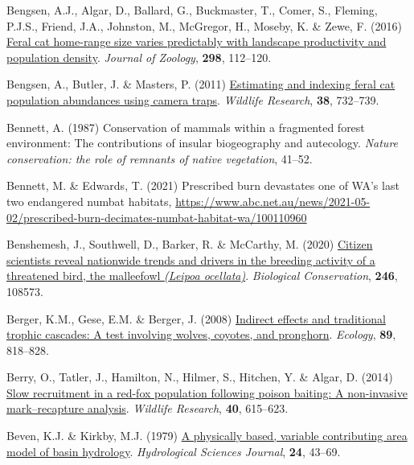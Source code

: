 \documentclass[11pt,a4paper,titlepage,twoside,openright]{style/unimelbthesis}
\newenvironment{CSLReferences}%
  {}%
  {\par}
\begin{document}
\begin{mainmatter}
\begin{CSLReferences}{1}{0}
\leavevmode{}%
Bengsen, A.J., Algar, D., Ballard, G., Buckmaster, T., Comer, S., Fleming, P.J.S., Friend, J.A., Johnston, M., McGregor, H., Moseby, K. \& Zewe, F. (2016) \href{https://doi.org/10.1111/jzo.12290}{Feral cat home-range size varies predictably with landscape productivity and population density}. \emph{Journal of Zoology}, \textbf{298}, 112--120.

\leavevmode{}%
Bengsen, A., Butler, J. \& Masters, P. (2011) \href{https://doi.org/10.1071/WR11134}{Estimating and indexing feral cat population abundances using camera traps}. \emph{Wildlife Research}, \textbf{38}, 732--739.

\leavevmode{}%
Bennett, A. (1987) Conservation of mammals within a fragmented forest environment: The contributions of insular biogeography and autecology. \emph{Nature conservation: the role of remnants of native vegetation}, 41--52.

\leavevmode{}%
Bennett, M. \& Edwards, T. (2021) Prescribed burn devastates one of {WA's} last two endangered numbat habitats, \url{https://www.abc.net.au/news/2021-05-02/prescribed-burn-decimates-numbat-habitat-wa/100110960}

\leavevmode{}%
Benshemesh, J., Southwell, D., Barker, R. \& McCarthy, M. (2020) \href{https://doi.org/10.1016/j.biocon.2020.108573}{Citizen scientists reveal nationwide trends and drivers in the breeding activity of a threatened bird, the malleefowl \emph{({Leipoa ocellata})}}. \emph{Biological Conservation}, \textbf{246}, 108573.

\leavevmode{}%
Berger, K.M., Gese, E.M. \& Berger, J. (2008) \href{https://doi.org/10.1890/07-0193.1}{Indirect effects and traditional trophic cascades: A test involving wolves, coyotes, and pronghorn}. \emph{Ecology}, \textbf{89}, 818--828.

\leavevmode{}%
Berry, O., Tatler, J., Hamilton, N., Hilmer, S., Hitchen, Y. \& Algar, D. (2014) \href{https://doi.org/10.1071/WR13073}{Slow recruitment in a red-fox population following poison baiting: A non-invasive mark--recapture analysis}. \emph{Wildlife Research}, \textbf{40}, 615--623.

\leavevmode{}%
Beven, K.J. \& Kirkby, M.J. (1979) \href{https://doi.org/10.1080/02626667909491834}{A physically based, variable contributing area model of basin hydrology}. \emph{Hydrological Sciences Journal}, \textbf{24}, 43--69.


\end{CSLReferences}
\end{mainmatter}
\end{document}
